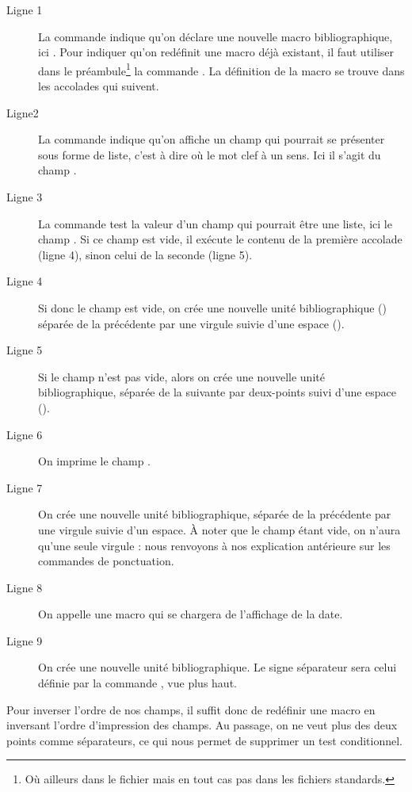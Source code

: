 \begin{description}
\item[Ligne 1]La commande  indique qu'on déclare une nouvelle macro bibliographique, ici . Pour indiquer qu'on redéfinit une macro déjà existant, il faut utiliser dans le préambule\footnote{Où ailleurs dans le fichier  mais en tout cas pas dans les fichiers standards.} la commande . La définition de la macro se trouve dans les accolades qui suivent.
\item[Ligne2]La commande  indique qu'on affiche un champ qui pourrait se présenter sous forme de liste, c'est à dire où le mot clef  à un sens. Ici il s'agit du champ . \item[Ligne 3]La commande  test la valeur d'un champ qui pourrait être une liste, ici le champ . Si ce champ est vide, il exécute le contenu de la première accolade (ligne 4), sinon celui de la seconde (ligne 5).
\item[Ligne 4]Si donc le champ  est vide, on crée une nouvelle unité bibliographique ()\label{unitepersonalisee} séparée de la précédente par une virgule suivie d'une espace ().
\item[Ligne 5]Si le champ  n'est pas vide, alors on crée une nouvelle unité bibliographique, séparée de la suivante par deux-points suivi d'une espace ().
\item[Ligne 6]On imprime le champ .
\item[Ligne 7]On crée une nouvelle unité bibliographique, séparée de la précédente par une virgule suivie d'un espace. À noter que le champ  étant vide, on n'aura qu'une seule virgule : nous renvoyons à nos explication antérieure sur les commandes de ponctuation.
\item[Ligne 8]On appelle une macro qui se chargera de l'affichage de la date.
\item[Ligne 9]On crée une nouvelle unité bibliographique. Le signe séparateur sera celui définie par la commande , vue plus haut.
\end{description}

Pour inverser l'ordre de nos champs, il suffit donc de redéfinir une macro en inversant l'ordre d'impression des champs. Au passage, on ne veut plus des deux points comme séparateurs, ce qui nous permet de supprimer un test conditionnel.


